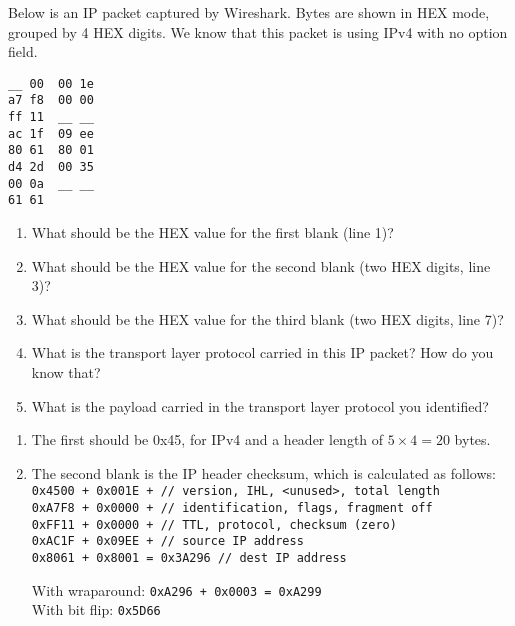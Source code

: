 \documentclass{report}
\begin{document}
\mktitle


\begin{problem}

Below is an IP packet captured by Wireshark.
Bytes are shown in HEX mode, grouped by 4 HEX digits.
We know that this packet is using IPv4 with no option field.

\begin{lstlisting}
__ 00  00 1e
a7 f8  00 00
ff 11  __ __
ac 1f  09 ee
80 61  80 01
d4 2d  00 35
00 0a  __ __
61 61
\end{lstlisting}

\begin{enumerate}
\item What should be the HEX value for the first blank (line 1)?
\item What should be the HEX value for the second blank (two HEX digits, line
      3)?
\item What should be the HEX value for the third blank (two HEX digits, line
      7)?
\item What is the transport layer protocol carried in this IP packet? How do
      you know that?
\item What is the payload carried in the transport layer protocol you
      identified?
\end{enumerate}

\begin{answer}{30em}
  \begin{enumerate}
    \item The first should be 0x45, for IPv4 and a header length of
          $5\times4 = 20$ bytes.

    \item The second blank is the IP header checksum, which is calculated as
          follows:\\
            \texttt{0x4500 + 0x001E + // version, IHL, <unused>, total length} \\
            \texttt{0xA7F8 + 0x0000 + // identification, flags, fragment off} \\
            \texttt{0xFF11 + 0x0000 + // TTL, protocol, checksum (zero)} \\
            \texttt{0xAC1F + 0x09EE + // source IP address} \\
            \texttt{0x8061 + 0x8001 = 0x3A296 // dest IP address}

          With wraparound: \texttt{0xA296 + 0x0003 = 0xA299}\\
          With bit flip: \texttt{0x5D66}


\end{enumerate}
\end{answer}
\end{problem}
\end{document}
